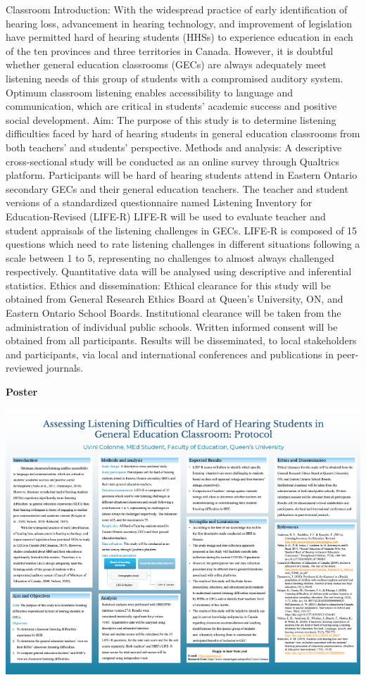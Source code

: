 \documentclass[
]{book}
\begin{document}
Classroom Introduction: With the widespread practice of early identification of hearing loss, advancement in hearing technology, and improvement of legislation have permitted hard of hearing students (HHSs) to experience education in each of the ten provinces and three territories in Canada. However, it is doubtful whether general education classrooms (GECs) are always adequately meet listening needs of this group of students with a compromised auditory system. Optimum classroom listening enables accessibility to language and communication, which are critical in students' academic success and positive social development. Aim: The purpose of this study is to determine listening difficulties faced by hard of hearing students in general education classrooms from both teachers' and students' perspective. Methods and analysis: A descriptive cross-sectional study will be conducted as an online survey through Qualtrics platform. Participants will be hard of hearing students attend in Eastern Ontario secondary GECs and their general education teachers. The teacher and student versions of a standardized questionnaire named Listening Inventory for Education-Revised (LIFE-R) LIFE-R will be used to evaluate teacher and student appraisals of the listening challenges in GECs. LIFE-R is composed of 15 questions which need to rate listening challenges in different situations following a scale between 1 to 5, representing no challenges to almost always challenged respectively. Quantitative data will be analysed using descriptive and inferential statistics. Ethics and dissemination: Ethical clearance for this study will be obtained from General Research Ethics Board at Queen's University, ON, and Eastern Ontario School Boards. Institutional clearance will be taken from the administration of individual public schools. Written informed consent will be obtained from all participants. Results will be disseminated, to local stakeholders and participants, via local and international conferences and publications in peer-reviewed journals.

\textbf{Poster}

\includegraphics{Content/UC.png}
\end{document}
